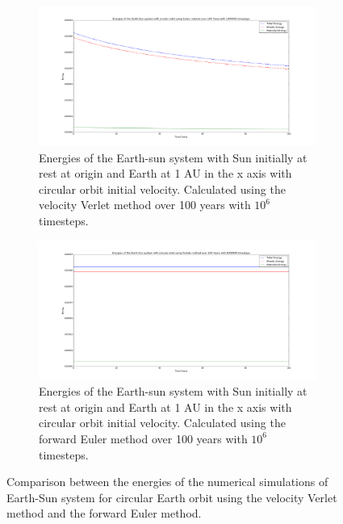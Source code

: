 \documentclass[a4paper,11pt]{article}
\begin{document}
{\begin{figure}[H]
	\centering
	\begin{subfigure}[b]{1\textwidth}
		\includegraphics[scale=0.3]{figure_9}
		\caption{Energies of the Earth-sun system with Sun initially at rest at origin and Earth at 1 AU in the x axis with circular orbit initial velocity. Calculated using the velocity Verlet method over 100 years with $10^{6}$ timesteps.}
		\label{fig:E_S_circular_verlet_energies}
	\end{subfigure}
	\begin{subfigure}[b]{1\textwidth}
		\includegraphics[scale=0.3]{figure_10}
		\caption{Energies of the Earth-sun system with Sun initially at rest at origin and Earth at 1 AU in the x axis with circular orbit initial velocity. Calculated using the forward Euler method over 100 years with $10^{6}$ timesteps.}
		\label{fig:E_S_circular_euler_energies}
	\end{subfigure}
	\caption{Comparison between the energies of the numerical simulations of Earth-Sun system for circular Earth orbit using the velocity Verlet method and the forward Euler method.}
	\label{fig:verlet_vs_euler_energies}
\end{figure}



}
\end{document}
